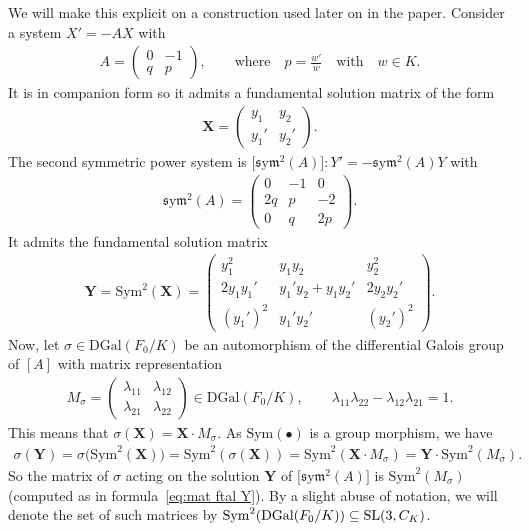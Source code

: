 \documentclass[10pt,a4paper]{amsart}
\numberwithin{equation}{section}
\def\Sym{\mathrm{Sym}}
\def\sym{\mathfrak{s}\mathrm{y}\mathfrak{m}}
\begin{document}
\begin{Example}\label{ex-second-sym}
We will make this explicit on a construction used later on in the paper.
Consider a system $X'=-A X$ with
\begin{gather*}
A =\begin{pmatrix}0&-1 \\q&p\end{pmatrix}\!,\qquad \textrm{where} \quad p=\frac{w'}{w}
	\quad\textrm{with}\quad w\in K.
\end{gather*}
It is in companion form so it admits a fundamental solution matrix of the form
	\begin{gather*}%
	 \mathbf{X}= \begin{pmatrix} y_1 & y_2 \\ y_1' & y_2' \end{pmatrix}\!.
	\end{gather*}
The second symmetric power system is $\big[ \sym^2 (A)\big]\colon Y'=-\sym^2 (A) Y$ with
\begin{gather*}
\sym^2 (A) = \begin{pmatrix} 0&-1&0\\2q &p
	&-2\\0&q& 2p
	\end{pmatrix}\!.
\end{gather*}
It admits the fundamental solution matrix
\begin{gather}\label{eq:mat ftal Y}
 \mathbf{Y}= \Sym^2 ( \mathbf{X}) = \begin{pmatrix} y_1^2 & y_1 y_2 & y_2^2 \\[3pt] 2y_1 y_1' & y_1' y_2 + y_1 y_2' & 2y_2y_2' \\[3pt] (y_1')^2 & y_1' y_2' & (y_2')^2 \end{pmatrix}\!.
\end{gather}
Now, let $\sigma \in \mathrm{DGal}(F_0/K)$ be an automorphism of the differential Galois group of $[A]$ with matrix representation
\begin{gather*}
M_{\sigma} = \begin{pmatrix} \lambda_{11} & \lambda_{12} \\ \lambda_{21} & \lambda_{22} \end{pmatrix} \in \mathrm{DGal}(F_0/K) , \qquad \lambda_{11} \lambda_{22} - \lambda_{12} \lambda_{21} = 1.
\end{gather*}
This means that $\sigma( \mathbf{X}) = \mathbf{X}\cdot M_{\sigma}$.
As $\Sym(\bullet)$ is a group morphism, we have
\begin{gather*}
\sigma( \mathbf{Y} ) = \sigma\big(\Sym^2( \mathbf{X})\big)
	= \Sym^2( \sigma( \mathbf{X}))
	= \Sym^2( \mathbf{X}\cdot M_{\sigma} )
	= \mathbf{Y}\cdot \Sym^2( M_{\sigma} ).
\end{gather*}
So the matrix of $\sigma$ acting on the solution $ \mathbf{Y}$ of $\big[\sym^2(A)\big]$ is
$\Sym^2( M_{\sigma})$ (computed as in formula~\eqref{eq:mat ftal Y}).
By a slight abuse of notation, we will denote the set of such matrices by $\Sym^2 (\mathrm{DGal}(F_0/K)) \subseteq {\rm SL}(3, C_K)$.
\end{Example}
\end{document}
